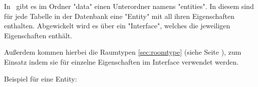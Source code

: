 
In \ZELIA\ gibt es im Ordner "data" einen Unterordner namens "entities". In diesem sind für jede Tabelle in der Datenbank eine "Entity" mit all ihren Eigenschaften enthalten. Abgewickelt wird es über ein "Interface", welches die jeweiligen Eigenschaften enthält.

Außerdem kommen hierbei die Raumtypen \ref{sec:roomtype} (siehe Seite \pageref{sec:roomtype}), zum Einsatz indem sie für einzelne Eigenschaften im Interface verwendet werden.

Beispiel für eine Entity:

